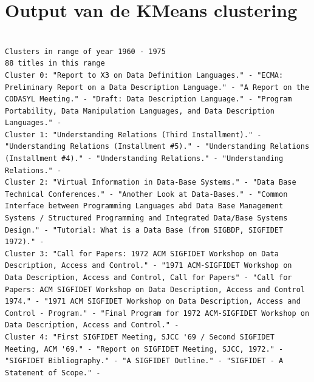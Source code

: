 \documentclass[a4paper,fontsize=11pt]{article}
\begin{document}
  \section{Output van de KMeans clustering}
  \label{sec:output}
  \begin{lstlisting}[caption={KMeans output},label={lst:output},breaklines]

Clusters in range of year 1960 - 1975
88 titles in this range
Cluster 0: "Report to X3 on Data Definition Languages." - "ECMA: Preliminary Report on a Data Description Language." - "A Report on the CODASYL Meeting." - "Draft: Data Description Language." - "Program Portability, Data Manipulation Languages, and Data Description Languages." - 
Cluster 1: "Understanding Relations (Third Installment)." - "Understanding Relations (Installment #5)." - "Understanding Relations (Installment #4)." - "Understanding Relations." - "Understanding Relations." - 
Cluster 2: "Virtual Information in Data-Base Systems." - "Data Base Technical Conferences." - "Another Look at Data-Bases." - "Common Interface between Programming Languages abd Data Base Management Systems / Structured Programming and Integrated Data/Base Systems Design." - "Tutorial: What is a Data Base (from SIGBDP, SIGFIDET 1972)." - 
Cluster 3: "Call for Papers: 1972 ACM SIGFIDET Workshop on Data Description, Access and Control." - "1971 ACM-SIGFIDET Workshop on Data Description, Access and Control, Call for Papers" - "Call for Papers: ACM SIGFIDET Workshop on Data Description, Access and Control 1974." - "1971 ACM SIGFIDET Workshop on Data Description, Access and Control - Program." - "Final Program for 1972 ACM-SIGFIDET Workshop on Data Description, Access and Control." - 
Cluster 4: "First SIGFIDET Meeting, SJCC '69 / Second SIGFIDET Meeting, ACM '69." - "Report on SIGFIDET Meeting, SJCC, 1972." - "SIGFIDET Bibliography." - "A SIGFIDET Outline." - "SIGFIDET - A Statement of Scope." - 



\end{lstlisting}
\end{document}
